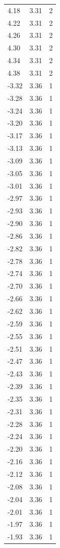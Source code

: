 \begin{longtable}{lrr}
  4.18 & 3.31 & 2 \\
  4.22 & 3.31 & 2 \\
  4.26 & 3.31 & 2 \\
  4.30 & 3.31 & 2 \\
  4.34 & 3.31 & 2 \\
  4.38 & 3.31 & 2 \\
  -3.32 & 3.36 & 1 \\
  -3.28 & 3.36 & 1 \\
  -3.24 & 3.36 & 1 \\
  -3.20 & 3.36 & 1 \\
  -3.17 & 3.36 & 1 \\
  -3.13 & 3.36 & 1 \\
  -3.09 & 3.36 & 1 \\
  -3.05 & 3.36 & 1 \\
  -3.01 & 3.36 & 1 \\
  -2.97 & 3.36 & 1 \\
  -2.93 & 3.36 & 1 \\
  -2.90 & 3.36 & 1 \\
  -2.86 & 3.36 & 1 \\
  -2.82 & 3.36 & 1 \\
  -2.78 & 3.36 & 1 \\
  -2.74 & 3.36 & 1 \\
  -2.70 & 3.36 & 1 \\
  -2.66 & 3.36 & 1 \\
  -2.62 & 3.36 & 1 \\
  -2.59 & 3.36 & 1 \\
  -2.55 & 3.36 & 1 \\
  -2.51 & 3.36 & 1 \\
  -2.47 & 3.36 & 1 \\
  -2.43 & 3.36 & 1 \\
  -2.39 & 3.36 & 1 \\
  -2.35 & 3.36 & 1 \\
  -2.31 & 3.36 & 1 \\
  -2.28 & 3.36 & 1 \\
  -2.24 & 3.36 & 1 \\
  -2.20 & 3.36 & 1 \\
  -2.16 & 3.36 & 1 \\
  -2.12 & 3.36 & 1 \\
  -2.08 & 3.36 & 1 \\
  -2.04 & 3.36 & 1 \\
  -2.01 & 3.36 & 1 \\
  -1.97 & 3.36 & 1 \\
  -1.93 & 3.36 & 1 \\

\end{longtable}
